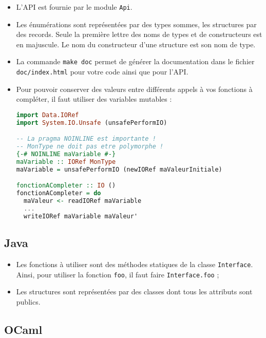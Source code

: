 \begin{itemize}
\item{L'API est fournie par le module \texttt{Api}.}
\item{Les énumérations sont représentées par des types sommes, les structures
      par des records. Seule la première lettre des noms de types et de
      constructeurs est en majuscule. Le nom du constructeur d'une structure
      est son nom de type.}
\item{La commande \texttt{make doc} permet de générer la documentation dans le
      fichier \texttt{doc/index.html} pour votre code ainsi que pour l'API.}
\item{Pour pouvoir conserver des valeurs entre différents appels à vos fonctions
      à compléter, il faut utiliser des variables mutables :}
\begin{lstlisting}[language=Haskell]
import Data.IORef
import System.IO.Unsafe (unsafePerformIO)

-- La pragma NOINLINE est importante !
-- MonType ne doit pas etre polymorphe !
{-# NOINLINE maVariable #-}
maVariable :: IORef MonType
maVariable = unsafePerformIO (newIORef maValeurInitiale)

fonctionACompleter :: IO ()
fonctionACompleter = do
  maValeur <- readIORef maVariable
  ...
  writeIORef maVariable maValeur'

\end{lstlisting}
\end{itemize}

\subsection{Java}

\begin{itemize}
\item{Les fonctions à utiliser sont des méthodes statiques de la classe
      \texttt{Interface}. Ainsi, pour utiliser la fonction \texttt{foo}, il
      faut faire \texttt{Interface.foo} ;}
\item{Les structures sont représentées par des classes dont tous les attributs
      sont publics.}
\end{itemize}

\subsection{OCaml}

